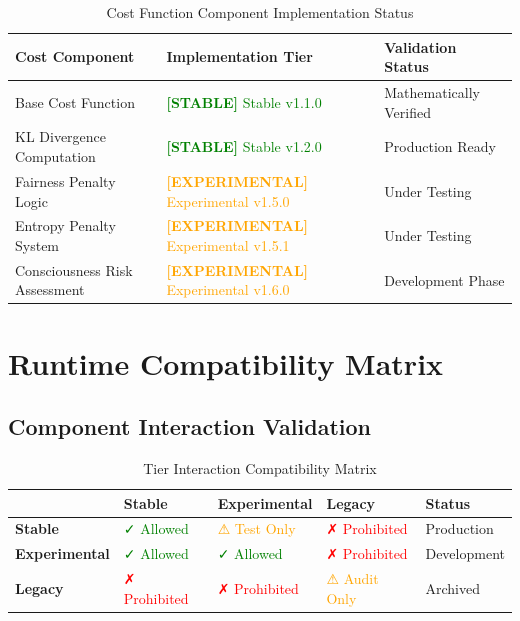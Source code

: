 \documentclass[11pt,letterpaper]{article}
\newcommand{\stablecomponent}[1]{\textcolor{green}{\textbf{[STABLE]} #1}}
\newcommand{\experimentalcomponent}[1]{\textcolor{orange}{\textbf{[EXPERIMENTAL]} #1}}
\begin{document}
\begin{table}[htbp]
\centering
\begin{tabular}{p{3cm}|p{4cm}|p{6cm}}
\toprule
\textbf{Cost Component} & \textbf{Implementation Tier} & \textbf{Validation Status} \\
\midrule
Base Cost Function & \stablecomponent{Stable v1.1.0} & Mathematically Verified \\
KL Divergence Computation & \stablecomponent{Stable v1.2.0} & Production Ready \\
Fairness Penalty Logic & \experimentalcomponent{Experimental v1.5.0} & Under Testing \\
Entropy Penalty System & \experimentalcomponent{Experimental v1.5.1} & Under Testing \\
Consciousness Risk Assessment & \experimentalcomponent{Experimental v1.6.0} & Development Phase \\
\bottomrule
\end{tabular}
\caption{Cost Function Component Implementation Status}
\end{table}

\section{Runtime Compatibility Matrix}
\label{sec:compatibility}

\subsection{Component Interaction Validation}

\begin{table}[h]
\centering
\begin{tabular}{p{2.5cm}|p{2.5cm}|p{2.5cm}|p{2.5cm}|p{2.5cm}}
\toprule
& \textbf{Stable} & \textbf{Experimental} & \textbf{Legacy} & \textbf{Status} \\
\midrule
\textbf{Stable} & \textcolor{green}{✓ Allowed} & \textcolor{orange}{⚠ Test Only} & \textcolor{red}{✗ Prohibited} & Production \\
\textbf{Experimental} & \textcolor{green}{✓ Allowed} & \textcolor{green}{✓ Allowed} & \textcolor{red}{✗ Prohibited} & Development \\
\textbf{Legacy} & \textcolor{red}{✗ Prohibited} & \textcolor{red}{✗ Prohibited} & \textcolor{orange}{⚠ Audit Only} & Archived \\
\bottomrule
\end{tabular}
\caption{Tier Interaction Compatibility Matrix}
\end{table}
\end{document}
